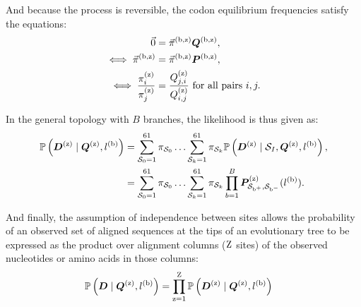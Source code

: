 And because the process is reversible, the \gls{codon} equilibrium frequencies satisfy the equations:
\begin{align}
    \vec{0} & = \vec{\pi}^{(\text{b}, \text{z})} \bm{Q}^{(\text{b}, \text{z})}, \\
    \iff \vec{\pi}^{(\text{b}, \text{z})} & = \vec{\pi}^{(\text{b}, \text{z})} \bm{P}^{(\text{b}, \text{z})}, \\
    \iff \dfrac{\pi_{{i}}^{(\text{z})}}{\pi_{{j}}^{(\text{z})}} & = \dfrac{Q_{{j}, {i}}^{(\text{z})}}{Q_{{i}, {j}}^{(\text{z})}} \text{ for all pairs }{i},{j}.
\end{align}

In the general topology with $B$ branches, the \gls{likelihood} is thus given as:
\begin{align}
    \mathbb{P} \left(\bm{D}^{(\text{z})} \mid \bm{Q}^{(\text{z})}, l^{(\text{b})} \right) & = \sum\limits_{\mathcal{S}_{0}=1}^{61} \pi_{\mathcal{S}_{0}} \hdots \sum\limits_{\mathcal{S}_{k}=1}^{61} \pi_{\mathcal{S}_{k}} \mathbb{P} \left(\bm{D}^{(\text{z})} \mid \mathcal{S}_{I}, \bm{Q}^{(\text{z})}, l^{(\text{b})} \right), \\
    & = \sum\limits_{\mathcal{S}_{0}=1}^{61} \pi_{\mathcal{S}_{0}} \hdots \sum\limits_{\mathcal{S}_{k}=1}^{61} \pi_{\mathcal{S}_{k}} \prod\limits_{b=1}^{B} \bm{P}^{(\text{z})}_{\mathcal{S}_{\text{b}^{+}}, \mathcal{S}_{\text{b}^{-}}}(l^{(\text{b})}). \label{eq:likelihood-site}
\end{align}

And finally, the assumption of independence between sites allows the probability of an observed set of aligned sequences at the tips of an evolutionary tree to be expressed as the product over alignment columns ($\text{Z}$ sites) of the observed nucleotides or amino acids in those columns:
\begin{align}
    \mathbb{P} \left(\bm{D} \mid \bm{Q}^{(\text{z})}, l^{(\text{b})} \right) & = \prod\limits_{\text{z}=1}^{\text{Z}} \mathbb{P} \left(\bm{D}^{(\text{z})} \mid \bm{Q}^{(\text{z})}, l^{(\text{b})} \right) \label{eq:likelihood}
\end{align}

